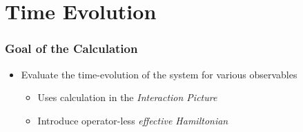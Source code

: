 \section{Time Evolution}

    \begin{frame}[t]
        \frametitle{Goal of the Calculation}

        \begin{itemize}
            \item Evaluate the time-evolution of the system for various observables \pause
            \begin{itemize}
                \item Uses calculation in the \emph{Interaction Picture} \pause
                \item Introduce operator-less \emph{effective Hamiltonian}
            \end{itemize}
        \end{itemize}

        \vspace{1cm}


        \onslide %
    \end{frame}

